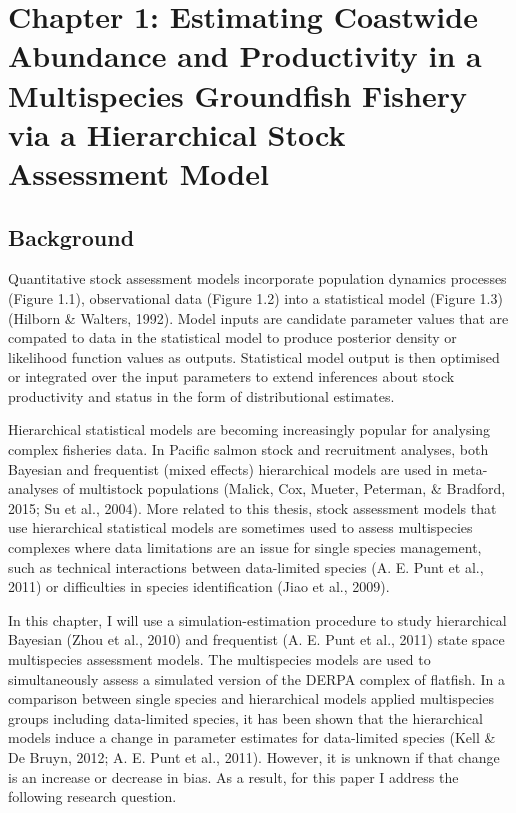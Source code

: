 \documentclass[12pt,]{scrartcl}
\begin{document}
\section{Chapter 1: Estimating Coastwide Abundance and Productivity in a
Multispecies Groundfish Fishery via a Hierarchical Stock Assessment
Model}\label{chapter-1-estimating-coastwide-abundance-and-productivity-in-a-multispecies-groundfish-fishery-via-a-hierarchical-stock-assessment-model}

\subsection{Background}\label{background-1}

Quantitative stock assessment models incorporate population dynamics
processes (Figure 1.1), observational data (Figure 1.2) into a
statistical model (Figure 1.3) (Hilborn \& Walters, 1992). Model inputs
are candidate parameter values that are compated to data in the
statistical model to produce posterior density or likelihood function
values as outputs. Statistical model output is then optimised or
integrated over the input parameters to extend inferences about stock
productivity and status in the form of distributional estimates.

Hierarchical statistical models are becoming increasingly popular for
analysing complex fisheries data. In Pacific salmon stock and
recruitment analyses, both Bayesian and frequentist (mixed effects)
hierarchical models are used in meta-analyses of multistock populations
(Malick, Cox, Mueter, Peterman, \& Bradford, 2015; Su et al., 2004).
More related to this thesis, stock assessment models that use
hierarchical statistical models are sometimes used to assess
multispecies complexes where data limitations are an issue for single
species management, such as technical interactions between data-limited
species (A. E. Punt et al., 2011) or difficulties in species
identification (Jiao et al., 2009).

In this chapter, I will use a simulation-estimation procedure to study
hierarchical Bayesian (Zhou et al., 2010) and frequentist (A. E. Punt et
al., 2011) state space multispecies assessment models. The multispecies
models are used to simultaneously assess a simulated version of the
DERPA complex of flatfish. In a comparison between single species and
hierarchical models applied multispecies groups including data-limited
species, it has been shown that the hierarchical models induce a change
in parameter estimates for data-limited species (Kell \& De Bruyn, 2012;
A. E. Punt et al., 2011). However, it is unknown if that change is an
increase or decrease in bias. As a result, for this paper I address the
following research question.
\end{document}
